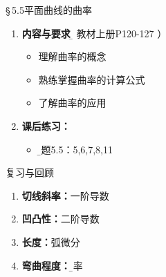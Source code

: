 \begin{frame}
	\titlepage
\end{frame}

\begin{frame}{\S\,5.5\;平面曲线的曲率}
	\linespread{1.5}
	\begin{enumerate}
	  \item {\bf 内容与要求}{\b（ 教材上册P120-127 ）}
	  \begin{itemize}
	    \item 理解曲率的概念
	    \item 熟练掌握曲率的计算公式
	    \item 了解曲率的应用
	  \vspace{1em}
	  \end{itemize}
	  \item {\bf 课后练习：}
	  \begin{itemize}
	    \item {\b 习题5.5：5,6,7,8,11}
	  \end{itemize}
	\end{enumerate}
\end{frame}

\begin{frame}{复习与回顾}
	\linespread{1.5}
	
	\begin{enumerate}
	  \item {\bf 切线斜率：}一阶导数
	  \item {\bf 凹凸性：}二阶导数
	  \item {\bf 长度：}弧微分\pause
	  \item {\bf 弯曲程度：}{\b 曲率}
	\end{enumerate}
\end{frame}

